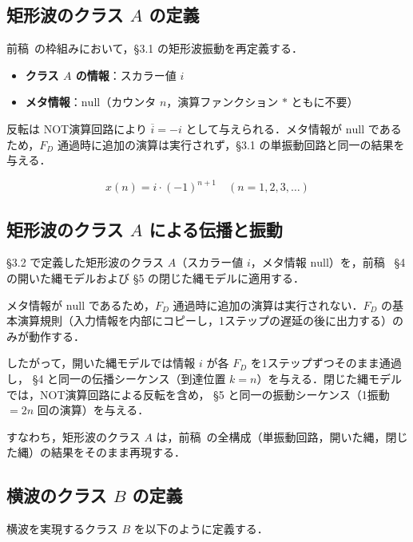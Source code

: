 \documentclass[12pt,a4paper]{ltjsarticle}
\begin{document}
\subsection{矩形波のクラス $A$ の定義}

前稿~\cite{ref2}の枠組みにおいて，\S 3.1 の矩形波振動を再定義する．

\begin{itemize}
  \item \textbf{クラス $A$ の情報}：スカラー値 $i$
  \item \textbf{メタ情報}：$\mathrm{null}$（カウンタ $n$，演算ファンクション $*$ ともに不要）
\end{itemize}

反転は NOT演算回路により $\overline{i} = -i$ として与えられる．メタ情報が $\mathrm{null}$ であるため，$F_D$ 通過時に追加の演算は実行されず，\S 3.1 の単振動回路と同一の結果を与える．

\begin{equation}
x(n) = i \cdot (-1)^{n+1} \quad (n = 1, 2, 3, \ldots)
\end{equation}

\subsection{矩形波のクラス $A$ による伝播と振動}

\S 3.2 で定義した矩形波のクラス $A$（スカラー値 $i$，メタ情報 $\mathrm{null}$）を，前稿~\cite{ref1} \S 4 の開いた縄モデルおよび \S 5 の閉じた縄モデルに適用する．

メタ情報が $\mathrm{null}$ であるため，$F_D$ 通過時に追加の演算は実行されない．$F_D$ の基本演算規則（入力情報を内部にコピーし，1ステップの遅延の後に出力する）のみが動作する．

したがって，開いた縄モデルでは情報 $i$ が各 $F_D$ を1ステップずつそのまま通過し，\cite{ref1} \S 4 と同一の伝播シーケンス（到達位置 $k = n$）を与える．閉じた縄モデルでは，NOT演算回路による反転を含め，\cite{ref1} \S 5 と同一の振動シーケンス（1振動 $= 2n$ 回の演算）を与える．

すなわち，矩形波のクラス $A$ は，前稿~\cite{ref1}の全構成（単振動回路，開いた縄，閉じた縄）の結果をそのまま再現する．

\subsection{横波のクラス $B$ の定義}

横波を実現するクラス $B$ を以下のように定義する．
\end{document}
